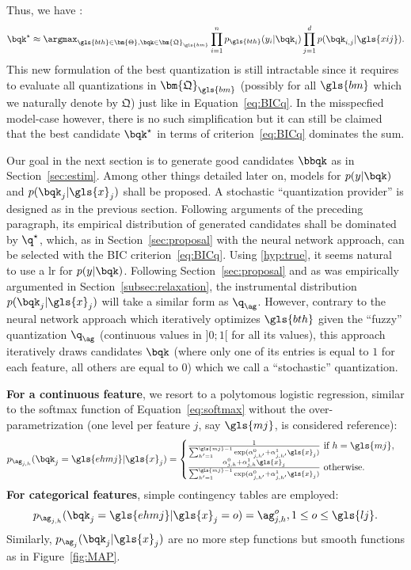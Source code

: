 Thus, we have :
\[ \bqk^\star \approx \argmax_{\gls{bth} \in \bm{\Theta}, \bqk \in \bm{\mathfrak{Q}}_{\gls{bm}}} \prod_{i=1}^n p_{\gls{bth}}(y_i | \bqk_i ) \prod_{j=1}^d p(\bqk_{i,j} | \gls{xij}). \]
This new formulation of the best quantization is still intractable since it requires to evaluate all quantizations in $\bm{\mathfrak{Q}}_{\gls{bm}}$ (possibly for all $\gls{bm}$ which we naturally denote by $\bm{\mathfrak{Q}}$) just like in Equation~\eqref{eq:BICq}.
In the misspecfied model-case however, there is no such simplification but it can still be claimed that the best candidate $\bqk^\star$ in terms of criterion~\eqref{eq:BICq} dominates the sum.

Our goal in the next section is to generate good candidates $\bbqk$ as in Section~\ref{sec:estim}. Among other things detailed later on, models for $p(y | \bqk)$ and $p(\bqk_j | \gls{x}_j)$ shall be proposed. 
A stochastic ``quantization provider'' is designed as in the previous section. Following arguments of the preceding paragraph, its empirical distribution of generated candidates shall be dominated by $\q^\star$,
which, as in Section~\ref{sec:proposal} with the neural network approach, can be selected with the BIC criterion~\eqref{eq:BICq}. Using \eqref{hyp:true}, it seems natural to use a \gls{lr} for $p( y | \bqk)$. Following Section~\ref{sec:proposal} and as was empirically argumented in Section~\ref{subsec:relaxation}, the instrumental distribution $p(\bqk_j | \gls{x}_j)$ will take a similar form as $\q_{\ag}$. However, contrary to the neural network approach which iteratively optimizes $\gls{bth}$ given the ``fuzzy'' quantization $\q_{\ag}$ (continuous values in $]0;1[$ for all its values), this approach iteratively draws candidates $\bqk$ (where only one of its entries is equal to $1$ for each feature, all others are equal to $0$) which we call a ``stochastic'' quantization.

{\bf For a continuous feature}, we resort to a polytomous logistic regression, similar to the softmax function of Equation~\eqref{eq:softmax} without the over-parametrization (one level per feature $j$, say $\gls{mj}$, is considered reference):
\[ p_{\ag_{j,h}}(\bqk_j = \gls{ehmj} | \gls{x}_j) = \begin{cases} \frac{1}{\sum_{h'=1}^{\gls{mj}-1} \exp(\alpha_{j,h'}^0 + \alpha_{j,h'}^1 \gls{x}_j)} \text{ if } h = \gls{mj}, \\ \frac{\alpha_{j,h}^0 + \alpha_{j,h}^1 \gls{x}_j}{\sum_{h'=1}^{\gls{mj}-1} \exp(\alpha_{j,h'}^0 + \alpha_{j,h'}^1 \gls{x}_j)} \text{ otherwise.} \end{cases} \]
{\bf For categorical features}, simple contingency tables are employed:
\[ p_{\ag_{j,h}}(\bqk_j = \gls{ehmj} | \gls{x}_j = o) = \ag_{j,h}^o, 1 \leq o \leq \gls{lj}. \]
Similarly, $p_{\ag_j}(\bqk_j | \gls{x}_j)$ are no more step functions but smooth functions as in Figure~\ref{fig:MAP}.

